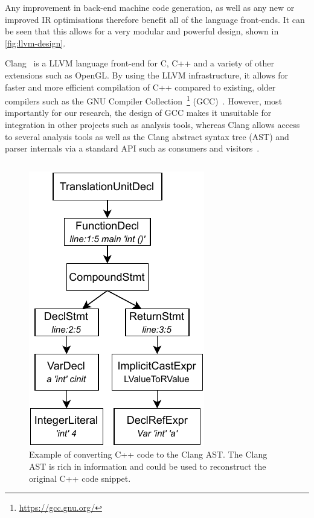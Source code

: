 \documentclass{mpaper}
\begin{document}
    Any improvement in back-end machine code generation, as well as any new or improved IR optimisations therefore benefit all of the language front-ends.
    It can be seen that this allows for a very modular and powerful design, shown in \autoref{fig:llvm-design}.
    
    Clang~\cite{Lattner2008} is a LLVM language front-end for C, C++ and a variety of other extensions such as OpenGL.
    By using the LLVM infrastructure, it allows for faster and more efficient compilation of C++ compared to existing, older compilers such as the GNU Compiler Collection~\footnote{\url{https://gcc.gnu.org/}} (GCC)~\cite{Lattner2008}.
    However, most importantly for our research, the design of GCC makes it unsuitable for integration in other projects such as analysis tools, whereas Clang allows access to several analysis tools as well as the Clang abstract syntax tree (AST) and parser internals via a standard API such as consumers and visitors~\cite{Duffy2014}.
    
    \begin{figure}
        \centering
        \inputminted{c++}{code/code-to-ast.cpp}
        \includegraphics{images/code-to-ast.pdf}
        \caption{Example of converting C++ code to the Clang AST. The Clang AST is rich in information and could be used to reconstruct the original C++ code snippet.}
        \label{fig:code-to-ast-example}
    \end{figure}
    
\end{document}
